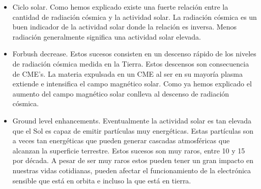 \begin{itemize}
	\item	Ciclo solar. Como hemos explicado existe una fuerte relación entre la cantidad de radiación cósmica y la actividad solar. La radiación
		cósmica es un buen indicador de la actividad solar donde la relación es inversa. Menos radiación generalmente significa una actividad
		solar elevada.
	\item	Forbush decrease\cite{Forbush1938}. Estos sucesos consisten en un descenso rápido de los niveles de radiación cósmica medida en la
		Tierra. Estos descensos son consecuencia de CME's. La materia expulsada en un CME al ser en su mayoría plasma extiende e intensifica
		el campo magnético solar. Como ya hemos explicado el aumento del campo magnético solar conlleva al descenso de radiación cósmica.
	\item	Ground level enhancements. Eventualmente la actividad solar es tan elevada que el Sol es capaz de emitir partículas muy energéticas.
		Estas partículas son a veces tan energéticas que pueden generar cascadas atmosféricas que alcanzan la superficie terrestre. Estos
		sucesos son muy raros, entre 10 y 15 por década. A pesar de ser muy raros estos pueden tener un gran impacto en nuestras vidas
		cotidianas, pueden afectar el funcionamiento de la electrónica sensible que está en orbita e incluso la que está en tierra.   
\end{itemize}

